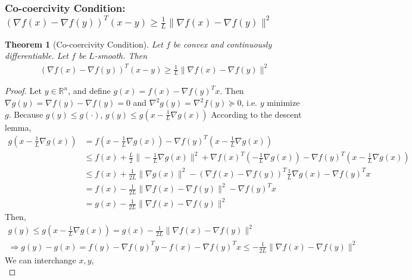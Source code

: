 \documentclass[11pt,a4paper]{article}
\newtheorem{theorem}{Theorem}
\begin{document}
\subsubsection{Co-coercivity Condition: $(\nabla f(x)-\nabla f(y))^T(x-y)\geq \frac{1}{L}\|\nabla f(x)-\nabla f(y)\|^2$}
\begin{theorem}[Co-coercivity Condition]
Let $f$ be convex and continuously differentiable. Let $f$ be $L$-smooth. Then
\begin{equation}
    \begin{aligned}
        (\nabla f(x)-\nabla f(y))^T(x-y)\geq \frac{1}{L}\|\nabla f(x)-\nabla f(y)\|^2
    \end{aligned}
    \nonumber
\end{equation}
\end{theorem}
\begin{proof}
Let $y\in \mathbb{R}^n$, and define $g(x)=f(x)-\nabla f(y)^Tx$. Then $\nabla g(y)=\nabla f(y)-\nabla f(y)=0$ and $\nabla^2 g(y)=\nabla^2 f(y)\succeq 0$, i.e. $y$ minimize $g$. Because $g(y)\leq g(\cdot)$, $g(y)\leq g(x-\frac{1}{L}\nabla g(x))$
According to the descent lemma,
\begin{equation}
    \begin{aligned}
        g(x-\frac{1}{L}\nabla g(x))&=f(x-\frac{1}{L}\nabla g(x))-\nabla f(y)^T(x-\frac{1}{L}\nabla g(x))\\
        &\leq f(x)+\frac{L}{2}\|-\frac{1}{L}\nabla g(x)\|^2+\nabla f(x)^T(-\frac{1}{L}\nabla g(x))-\nabla f(y)^T(x-\frac{1}{L}\nabla g(x))\\
        &\leq f(x)+\frac{1}{2L}\|\nabla g(x)\|^2-(\nabla f(x)-\nabla f(y))^T\frac{1}{L}\nabla g(x)-\nabla f(y)^Tx\\
        &=f(x)-\frac{1}{2L}\|\nabla f(x)-\nabla f(y)\|^2-\nabla f(y)^Tx\\
        &=g(x)-\frac{1}{2L}\|\nabla f(x)-\nabla f(y)\|^2
    \end{aligned}
    \nonumber
\end{equation}
Then,
\begin{equation}
    \begin{aligned}
        g(y)\leq g(x-\frac{1}{L}\nabla g(x))=g(x)-\frac{1}{2L}\|\nabla f(x)-\nabla f(y)\|^2\\
        \Rightarrow	g(y)-g(x)=f(y)-\nabla f(y)^Ty-f(x)-\nabla f(y)^Tx\leq -\frac{1}{2L}\|\nabla f(x)-\nabla f(y)\|^2
    \end{aligned}
    \nonumber
\end{equation}
We can interchange $x,y$,
\begin{equation}

\end{equation}
\end{proof}
\end{document}
